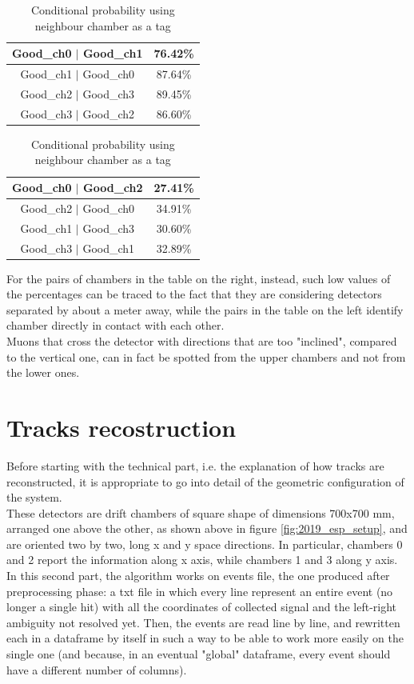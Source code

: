 \documentclass[a4paper,11pt]{book}
\begin{document}
\begin{table}[!h]
\centering
\begin{tabular}{c|c}
\toprule
Good\_ch0 $\mid$ Good\_ch1 &  76.42\% \\
\midrule
Good\_ch1 $\mid$ Good\_ch0 &  87.64\% \\
\midrule
Good\_ch2 $\mid$ Good\_ch3 &  89.45\% \\
\midrule
Good\_ch3 $\mid$ Good\_ch2 &  86.60\% \\
\bottomrule
\end{tabular}
\begin{tabular}{c|c}
\toprule
Good\_ch0 $\mid$ Good\_ch2 &  27.41\% \\
\midrule
Good\_ch2 $\mid$ Good\_ch0 &  34.91\% \\
\midrule
Good\_ch1 $\mid$ Good\_ch3 &  30.60\% \\
\midrule
Good\_ch3 $\mid$ Good\_ch1 &  32.89\% \\
\bottomrule
\end{tabular}
\caption{Conditional probability using neighbour chamber as a tag}
\label{tab:chamber_efficiency}
\end{table}

For the pairs of chambers in the table on the right, instead, such low values of the percentages can be traced to the fact that they are considering detectors separated by about a meter away, while the pairs in the table on the left identify chamber directly in contact with each other.\\
Muons that cross the detector with directions that are too "inclined", compared to the vertical one, can in fact be spotted from the upper chambers and not from the lower ones.\\


\chapter{Tracks recostruction}

Before starting with the technical part, i.e. the explanation of how tracks are reconstructed, it is appropriate to go into detail of the geometric configuration of the system.\\
These detectors are drift chambers of square shape of dimensions 700x700 mm, arranged one above the other, as shown above in figure \ref{fig:2019_esp_setup}, and are oriented two by two, long x and y space directions. In particular, chambers 0 and 2 report the information along x axis, while chambers 1 and 3 along y axis.\\
In this second part, the algorithm works on events file, the one produced after preprocessing phase: a txt file in which every line represent an entire event (no longer a single hit) with all the coordinates of collected signal and the left-right ambiguity not resolved yet. Then, the events are read line by line, and rewritten each in a dataframe by itself in such a way to be able to work more easily on the single one (and because, in an eventual "global" dataframe, every event should have a different number of columns).\\
\end{document}
